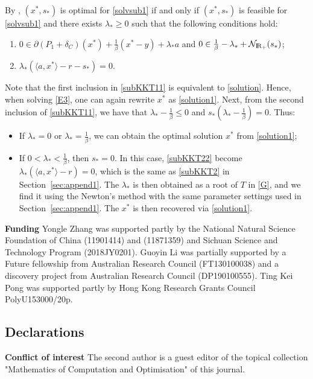 \documentclass[10pt]{article}
\numberwithin{equation}{section}
\def\R{{\rm I\!R}}
\begin{document}
By \cite[Corollary~28.2.1, Theorem~28.3]{Ro70}, $(x^*, s_*)$ is optimal for \eqref{solvsub1} if and only if $(x^*, s_*)$ is feasible for \eqref{solvsub1} and there exists $\lambda_*\ge 0$ such that the following conditions hold:
\begin{enumerate}[{\rm (A)}]
  \item\label{subKKT11}  $0\in\partial (P_1 + \delta_{C})(x^*) + \frac{1}{\beta}(x^* - y) + \lambda_*a $ and $0\in \frac{1}{\beta} - \lambda_* + \mathcal{N}_{\R_+}(s_*)$;
  \item\label{subKKT22}  $\lambda_*(\langle a, x^*\rangle - r - s_*)=0$.
\end{enumerate}
Note that the first inclusion in \eqref{subKKT11} is equivalent to \eqref{solution}. Hence, when solving \eqref{E3}, one can again rewrite $x^*$ as \eqref{solution1}. Next, from the second inclusion of \eqref{subKKT11}, we have that $\lambda_* - \frac{1}{\beta} \leq 0$ and $s_*(\lambda_* - \frac{1}{\beta}) = 0$. Thus:
\begin{itemize}
  \item If $\lambda_* = 0$ or $\lambda_* = \frac{1}{\beta}$, {\color{blue} we }can obtain the optimal solution $x^*$ from \eqref{solution1};
  \item If $0< \lambda_* < \frac{1}{\beta}$, then $s_* = 0$. In this case, \eqref{subKKT22} become $\lambda_*(\langle a, x^*\rangle - r)=0$, which is the same as \eqref{subKKT2} in Section~\ref{sec:append1}. The $\lambda_*$ is then obtained as a root of $T$ in \eqref{G}, and we find it using the Newton's method with the same parameter settings used in Section~\ref{sec:append1}. The $x^*$ is then recovered via \eqref{solution1}.
\end{itemize}

{\color{blue}
\textbf{Funding} Yongle Zhang was supported partly by the National Natural Science Foundation of China (11901414) and (11871359) and Sichuan Science and Technology Program (2018JY0201). Guoyin Li was partially supported by a Future fellowship from Australian Research Council (FT130100038) and a discovery project from Australian Research Council (DP190100555). Ting Kei Pong was supported partly by Hong Kong Research Grants Council PolyU153000/20p.

\subsection*{Declarations}
\textbf{Conflict of interest} The second author is a guest editor of the topical collection "Mathematics of Computation and Optimisation" of this journal. }
\end{document}
